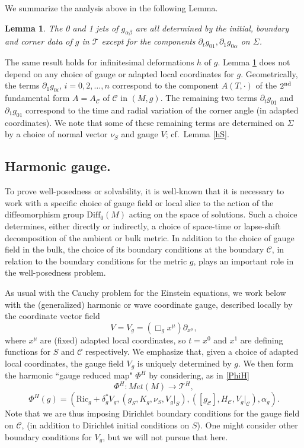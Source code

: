\documentclass[10pt]{amsart}
\renewcommand{\a}{\alpha}
\renewcommand{\b}{\beta}
\renewcommand{\d}{\delta}
\newcommand{\Si}{\Sigma}
\newcommand{\cC}{{\mathcal C}}
\newcommand{\cT}{{\mathcal T}}
\newcommand{\Ric}{\mathrm{Ric}}
\newcommand{\Diff}{\mathrm{Diff}}
\newcommand{\be}{\begin{equation}}
\newcommand{\ee}{\end{equation}}
\newcommand{\p}{\partial}
\renewcommand{\to}{\rightarrow}
\newcommand{\<}{\langle}
\renewcommand{\>}{\rangle}
\theoremstyle{plain}
\newtheorem{lemma}{Lemma}[section]
\theoremstyle{remark}
\theoremstyle{definition}
\numberwithin{equation}{section}
\begin{document}
 
   We summarize the analysis above in the following Lemma. 
\begin{lemma}\label{corner}
The 0 and 1 jets of $g_{\a\b}$ are all determined by the initial, boundary and corner data of $g$ in $\cT$ except for the components 
$\p_t g_{01}, \p_1 g_{0\alpha}$ on $\Si$.
\end{lemma} 

  The same result holds for infinitesimal deformations $h$ of $g$. Lemma \ref{corner} does not depend on any choice of gauge or 
adapted local coordinates for $g$. Geometrically, the terms $\p_1 g_{0i}$, $i = 0,2, \dots, n$ correspond to the component $A(T, \cdot)$ 
of the $2^{\rm nd}$ fundamental form $A = A_{\cC}$ of $\cC$ in $(M, g)$. The remaining two terms $\p_t g_{01}$ and $\p_1 g_{01}$ correspond 
to the time and radial variation of the corner angle (in adapted coordinates). We note that some of these remaining terms are determined on 
$\Si$ by a choice of normal vector $\nu_S$ and gauge $V$; cf.~Lemma \ref{hS}. 

   
\subsection{Harmonic gauge.}

To prove well-posedness or solvability, it is well-known that it is necessary to work with a specific choice of gauge field or local slice to 
the action of the diffeomorphism group $\Diff_0(M)$ acting on the space of solutions. Such a choice determines, either directly or indirectly, 
a choice of space-time or lapse-shift decomposition of the ambient or bulk metric. In addition to the choice of gauge field in the bulk, the choice of 
its boundary conditions at the boundary $\cC$, in relation to the boundary conditions for the metric $g$, plays an important role in the well-posedness 
problem.  

As usual with the Cauchy problem for the Einstein equations, we work below with the (generalized) harmonic or wave coordinate gauge, described 
locally by the coordinate vector field    
\be \label{harm}
V = V_g = (\Box_g x^{\mu})\p_{x^{\mu}},
\ee
where $x^{\mu}$ are (fixed) adapted local coordinates, so $t = x^0$ and $x^1$ are defining functions for $S$ and $\cC$ respectively. 
We emphasize that, given a choice of adapted local coordinates, the gauge field $V_g$ is uniquely determined by $g$. 
We then form the harmonic ``gauge reduced map" $\Phi^H$ by considering, as in \eqref{PhiH}  
\be \label{PhiH1}
\Phi^H: Met(M) \to \cT^H,
\ee
$$\Phi^H(g) = (\Ric_g + \d_g^* V_g, (g_S, K_g, \nu_S, V_g|_S), ([g_{\cC}], H_{\cC}, V_g|_{\cC}), \a_g).$$ 
Note that we are thus imposing Dirichlet boundary conditions for the gauge field on $\cC$, (in addition to Dirichlet initial 
conditions on $S$). One might consider other boundary conditions for $V_g$, but we will not pursue that here. 
  
\end{document}
